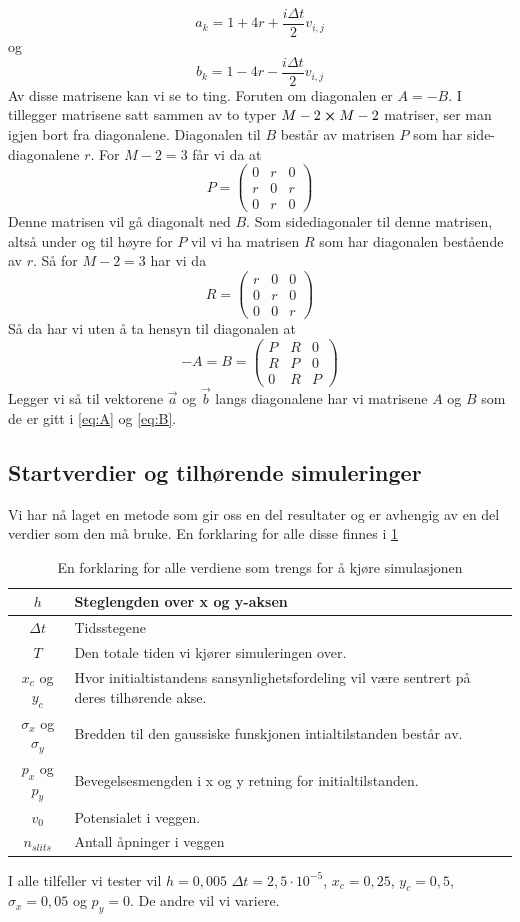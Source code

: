 \documentclass[reprint,english,notitlepage]{revtex4-2}  %
\begin{document}
$$
a_k=1+4r+\frac{i\Delta t}{2}v_{i,j}
$$
og
$$
b_k=1-4r-\frac{i\Delta t}{2}v_{i,j}
$$
Av disse matrisene kan vi se to ting. Foruten om diagonalen er $A=-B$. I tillegger matrisene satt sammen av to typer $M-2 \cross M-2$ matriser, ser man igjen bort fra diagonalene. Diagonalen til $B$ består av matrisen $P$ som har side-diagonalene $r$. For $M-2=3$ får vi da at
$$
P=\begin{pmatrix}
	0 &r&0\\
	r &0 &r \\
	0 & r& 0
\end{pmatrix}
$$
Denne matrisen vil gå diagonalt ned $B$. Som sidediagonaler til denne matrisen, altså under og til høyre for $P$ vil vi ha matrisen $R$ som har diagonalen bestående av $r$. Så for $M-2=3$ har vi da
$$
R=\begin{pmatrix}
	r&0&0 \\
	0&r&0 \\
	0&0&r
\end{pmatrix}
$$
Så da har vi uten å ta hensyn til diagonalen at
$$
-A=B=\begin{pmatrix}
	P&R&0 \\
	R&P&0 \\
	0&R&P
\end{pmatrix}
$$
Legger vi så til vektorene $\vec{a}$ og $\vec{b}$ langs diagonalene har vi matrisene $A$ og $B$ som de er gitt i \autoref{eq:A} og \autoref{eq:B}.
\subsection{Startverdier og tilhørende simuleringer}
Vi har nå laget en metode som gir oss en del resultater og er avhengig av en del verdier som den må bruke. En forklaring for alle disse finnes i \ref{table:Initverdier}
\begin{table}[H]
\centering
	\begin{tabular}{|c|p{40mm}|}
		\hline
		$h$ & Steglengden over x og y-aksen \\\hline 
		$\Delta t$ & Tidsstegene \\\hline 
		$T$ & Den totale tiden vi kjører simuleringen over. \\\hline
		$x_c$ og $y_c$ & Hvor initialtistandens sansynlighetsfordeling vil være sentrert på deres tilhørende akse. \\\hline 
		$\sigma_x$ og $\sigma_y$ & Bredden til den gaussiske funskjonen intialtilstanden består av. \\\hline 
		$p_x$ og $p_y$ & Bevegelsesmengden i x og y retning for initialtilstanden. \\\hline 
		$v_0$ & Potensialet i veggen. \\\hline
		$n_{slits}$ & Antall åpninger i veggen \\\hline
	\end{tabular}
\caption{En forklaring for alle verdiene som trengs for å kjøre simulasjonen}
\label{table:Initverdier}
\end{table}
I alle tilfeller vi tester vil $h=0,005$ $\Delta t=2,5\cdot 10^{-5}$, $x_c=0,25$, $y_c=0,5$, $\sigma_x=0,05$ og $p_y=0$. De andre vil vi variere.
\end{document}
